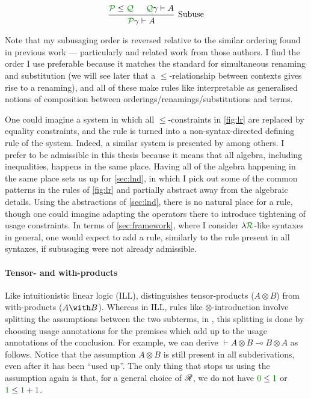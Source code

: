 \[
  \begin{prooftree}
    \hypo{\grP \leq \grQ}
    \hypo{\grQ\gamma \vdash A}
    \infer2[Subuse]{\grP\gamma \vdash A}
  \end{prooftree}
\]

Note that my subusaging order is reversed relative to the similar ordering found
in previous work --- particularly \citet{Granule18} and related work from those
authors.
I find the order I use preferable because it matches the standard for
simultaneous renaming and substitution (we will see later that a
$\leq$-relationship between contexts gives rise to a renaming), and all of these
make rules like  interpretable as generalised notions of
composition between orderings/renamings/substitutions and terms.

One could imagine a system in which all $\leq$-constraints in \cref{fig:lr} are
replaced by equality constraints, and the  rule is turned into a
non-syntax-directed defining rule of the system.
Indeed, a similar system is presented by \citet{Granule18} among others.
I prefer  to be admissible in this thesis because it means that
all algebra, including inequalities, happens in the same place.
Having all of the algebra happening in the same place sets us up for
\cref{sec:lnd}, in which I pick out some of the common patterns in the rules of
\cref{fig:lr} and partially abstract away from the algebraic details.
Using the abstractions of \cref{sec:lnd}, there is no natural place for a
 rule, though one could imagine adapting the operators there to
introduce tightening of usage constraints.
In terms of \cref{sec:framework}, where I consider $\name$-like syntaxes in
general, one would expect to add a  rule, similarly to the
 rule present in all syntaxes, if subusaging were not already
admissible.

\paragraph{Tensor- and with-products}
Like intuitionistic linear logic (ILL), \name{} distinguishes tensor-products
($A \otimes B$) from with-products ($A \with B$).
Whereas in ILL, rules like $\otimes$-introduction involve splitting the
assumptions between the two subterms, in \name{}, this splitting is done by
choosing usage annotations for the premises which add up to the usage
annotations of the conclusion.
For example, we can derive $\vdash A \otimes B \multimap B \otimes A$ as
follows.
Notice that the assumption $A \otimes B$ is still present in all subderivations,
even after it has been ``used up''.
The only thing that stops us using the assumption again is that, for a general
choice of $\mathscr R$, we do not have $\gr0 \leq \gr1$ or $\gr1 \leq \gr1 + \gr1$.

